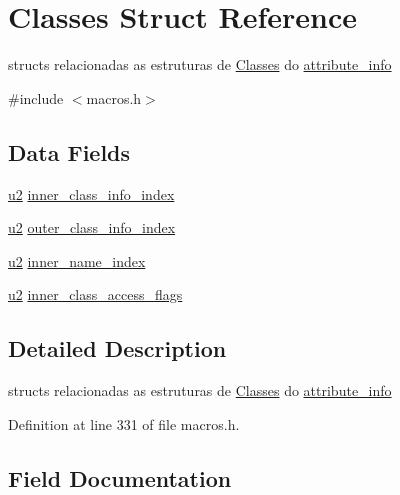 \hypertarget{struct_classes}{}\section{Classes Struct Reference}
\label{struct_classes}


structs relacionadas as estruturas de \hyperlink{struct_classes}{Classes} do \hyperlink{structattribute__info}{attribute\+\_\+info}  




{\ttfamily \#include $<$macros.\+h$>$}

\subsection*{Data Fields}
\begin{DoxyCompactItemize}
\item 
\hyperlink{macros_8h_aa76d8c8015643c6a837661a10142016e}{u2} \hyperlink{struct_classes_a84a9a6c8c14f8900137a8f51b446d6c2}{inner\+\_\+class\+\_\+info\+\_\+index}
\item 
\hyperlink{macros_8h_aa76d8c8015643c6a837661a10142016e}{u2} \hyperlink{struct_classes_a3b7a87f79f7ea8908d258f19b237bec2}{outer\+\_\+class\+\_\+info\+\_\+index}
\item 
\hyperlink{macros_8h_aa76d8c8015643c6a837661a10142016e}{u2} \hyperlink{struct_classes_ac792b66aa74db5d300bf22502fb49ef1}{inner\+\_\+name\+\_\+index}
\item 
\hyperlink{macros_8h_aa76d8c8015643c6a837661a10142016e}{u2} \hyperlink{struct_classes_ac48b6a5142c6e2ddcd51d41ab733eb15}{inner\+\_\+class\+\_\+access\+\_\+flags}
\end{DoxyCompactItemize}


\subsection{Detailed Description}
structs relacionadas as estruturas de \hyperlink{struct_classes}{Classes} do \hyperlink{structattribute__info}{attribute\+\_\+info} 

Definition at line 331 of file macros.\+h.



\subsection{Field Documentation}
\hypertarget{struct_classes_ac48b6a5142c6e2ddcd51d41ab733eb15}{}
